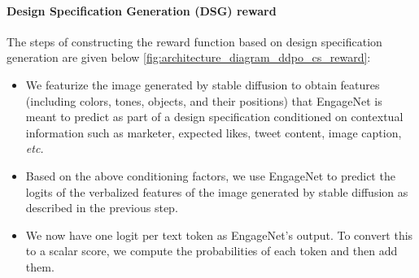 \paragraph{Design Specification Generation (DSG) reward}
The steps of constructing the reward function based on design specification generation are given below \ref{fig:architecture_diagram_ddpo_cs_reward}:
     \begin{itemize}
         \item We featurize the image generated by stable diffusion to obtain features (including colors, tones, objects, and their positions) that EngageNet is meant to predict as part of a design specification conditioned on contextual information such as marketer, expected likes, tweet content, image caption, \textit{etc.}

         \item Based on the above conditioning factors, we use EngageNet to predict the logits of the verbalized features of the image generated by stable diffusion as described in the previous step.
         \item We now have one logit per text token as EngageNet's output. To convert this to a scalar score, we compute the probabilities of each token and then add them.

     \end{itemize}
 

 
 
